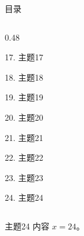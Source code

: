 \documentclass[aspectratio=169,10pt,fontset=fandol]{ctexbeamer}
\begin{document}
\begin{frame}[t,fragile]{目录}
\begin{columns}[T,onlytextwidth]
\begin{column}{0.48\textwidth}
{\color{black}\small 17. 主题17\par}\vspace{0.22em}
{\color{black}\small 18. 主题18\par}\vspace{0.22em}
{\color{black}\small 19. 主题19\par}\vspace{0.22em}
{\color{black}\small 20. 主题20\par}\vspace{0.22em}
{\color{black}\small 21. 主题21\par}\vspace{0.22em}
{\color{black}\small 22. 主题22\par}\vspace{0.22em}
{\color{black}\small 23. 主题23\par}\vspace{0.22em}
{\color{blue}\small 24. 主题24\par}\vspace{0.22em}
\end{column}
\end{columns}
\end{frame}
\begin{frame}[t,fragile]{主题24}
\normalsize
{\normalsize
内容 $x=24$。
}
\end{frame}
\end{document}
